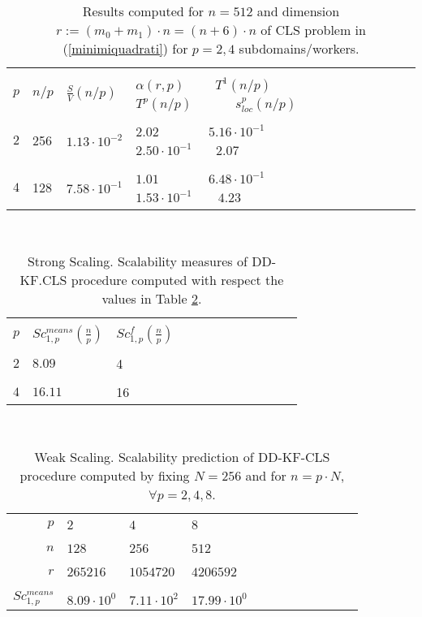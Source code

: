 \documentclass{report}
\begin{document}
 \begin{table}
\caption{Results computed for $n = 512$ and dimension $r:=(m_0+m_1)\cdot n=(n+6)\cdot n$ of CLS problem in  (\ref{minimiquadrati}) for $p = 2,4$ subdomains/workers.}
\label{tab1}
\\
\centering
\begin{tabular}{rlllllllllll}
\hline
\\
 $p$ &  $n/p$  & $\frac{S}{V}(n/p)$& $\alpha(r,p)$ \ \ \ \ $T^1(n/p)$ \ \ \ \  $T^p(n/p)$ \ \ \ \ \ \  $s_{loc}^p(n/p)$\\
 \\
\hline
$2$ & 256 &  $ 1.13\cdot 10^{-2}$ &$2.02$ \ \ \ \ \ \ \ $5.16\cdot 10^{-1}$ \ \  $2.50\cdot 10^{-1}$ \ \ \ $2.07$  \\
\\
$4$  & 128  &$7.58\cdot 10^{-1}$ &$1.01$ \ \ \ \ \ \ \ $6.48\cdot 10^{-1}$ \ \  $1.53\cdot 10^{-1}$\ \ \ \  $4.23$ \\
\hline 
\end{tabular}
\end{table} 




 \begin{table}
\caption{Strong Scaling. Scalability measures of DD-KF.CLS procedure computed with respect the values in Table \ref{tab2}.}
\label{tab2}
\\
\centering
\begin{tabular}{rlllllllllll}
\hline
\\
$p$ & $Sc_{1,p}^{means}(\frac{n}{p})$&$Sc_{1,p}^{f}(\frac{n}{p})$\\
\\
\hline 
$2$&$8.09$&4\\
\\
$4$&$16.11$&16\\
\hline
\end{tabular}
\end{table} 







\begin{table}
\caption{Weak Scaling. Scalability prediction of DD-KF-CLS procedure computed by fixing $N=256$ and for $n=p\cdot N$, $\forall p=2,4,8$.}
\label{tab3}
\\
\centering
\begin{tabular}{r|lllllllllll}
\hline
\\
$p$   & $2$ & $4$  &  $8$    \\
\\
\hline
\\
$n$& $128$& $256$& $512$\\
\\
\hline
\\
$r$&$265216$& $1054720$&$4206592$\\
\\
\hline
\\
$Sc_{1,p}^{means}$& $8.09 \cdot 10^{0}$ &$7.11\cdot 10^{2}$&$17.99\cdot 10^{0}$\\
\hline
\end{tabular}
\end{table} 
\end{document}
